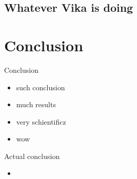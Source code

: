 \documentclass[hyperref=unicode,graphics=pdflatex,13pt]{beamer}
\begin{document}
\subsection{Whatever Vika is doing}

\section{Conclusion}

\begin{frame}{Conclusion}
 \begin{itemize}
  \item such conclusion
  \item much results
  \item very schientificz
  \item wow
 \end{itemize}

\end{frame}

\begin{frame}{Actual conclusion}
 \begin{itemize}
  \item 
 \end{itemize}

\end{frame}
\end{document}
